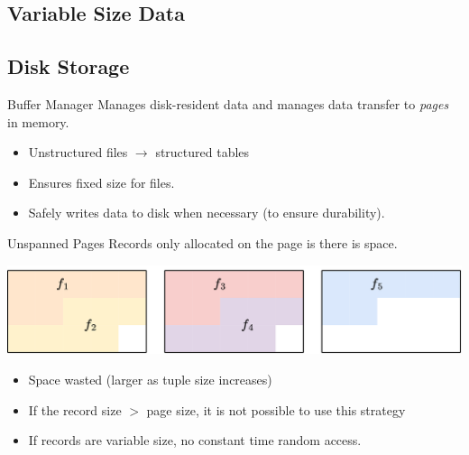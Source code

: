 \subsection{Variable Size Data}

\subsection{Disk Storage}
\begin{definitionbox}{Buffer Manager}
    Manages disk-resident data and manages data transfer to \textit{pages} in memory.
    \begin{itemize}
        \item Unstructured files $\to$ structured tables
        \item Ensures fixed size for files.
        \item Safely writes data to disk when necessary (to ensure durability).
    \end{itemize}
\end{definitionbox}

\begin{definitionbox}{Unspanned Pages}
    Records only allocated on the page is there is space.
    \begin{center}
        \includegraphics[width=.8\textwidth]{storage/images/unspanned_page.drawio.png}
    \end{center}
    \begin{itemize}
        \item Space wasted (larger as tuple size increases)
        \item If the record size $>$ page size, it is not possible to use this strategy
        \item If records are variable size, no constant time random access.
    \end{itemize}
\end{definitionbox}

